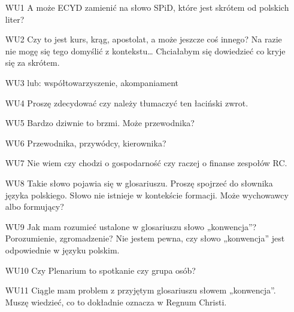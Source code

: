 ﻿\documentclass{report}
\begin{document}
\begin{itemize}


\item  [WU1]A może ECYD zamienić na słowo SPiD, które jest skrótem od polskich liter?


\item  [WU2]Czy to jest kurs, krąg, apostolat,  a może jeszcze coś innego? Na razie nie mogę się tego domyślić z kontekstu… Chciałabym się dowiedzieć co kryje się za skrótem.


\item  [WU3]lub: współtowarzyszenie, akompaniament


\item  [WU4]Proszę zdecydować czy należy tłumaczyć ten łaciński zwrot.


\item  [WU5]Bardzo dziwnie to brzmi. Może przewodnika?


\item  [WU6]Przewodnika, przywódcy, kierownika?


\item  [WU7]Nie wiem czy chodzi o gospodarność czy raczej o finanse zespołów RC.


\item  [WU8]Takie słowo pojawia się w glosariuszu. Proszę spojrzeć do słownika języka polskiego. Słowo nie istnieje w kontekście formacji. Może wychowawcy albo formujący?


\item  [WU9]Jak mam rozumieć ustalone w glosariuszu słowo „konwencja”? Porozumienie, zgromadzenie? Nie jestem pewna, czy słowo „konwencja” jest odpowiednie w języku polskim.


\item  [WU10]Czy Plenarium to spotkanie czy grupa osób?


\item  [WU11]Ciągle mam problem z przyjętym glosariuszu słowem „konwencja”. Muszę wiedzieć, co to dokładnie oznacza w Regnum Christi.


\end{itemize}
\end{document}

